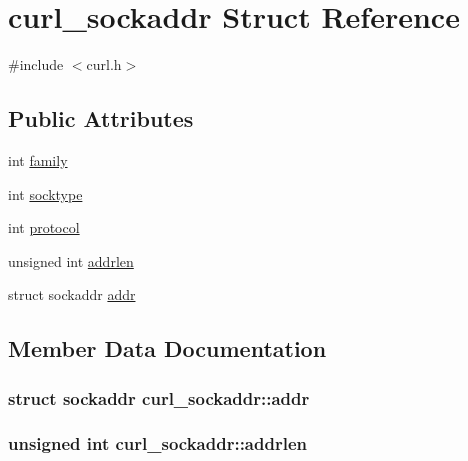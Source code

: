 \hypertarget{structcurl__sockaddr}{}\section{curl\+\_\+sockaddr Struct Reference}
\label{structcurl__sockaddr}


{\ttfamily \#include $<$curl.\+h$>$}

\subsection*{Public Attributes}
\begin{DoxyCompactItemize}
\item 
int \hyperlink{structcurl__sockaddr_ad5406982faaa070b7c928686ed31fdae}{family}
\item 
int \hyperlink{structcurl__sockaddr_a2c6c2c2083f3436c8b46c7d658be9aca}{socktype}
\item 
int \hyperlink{structcurl__sockaddr_ab59abd90c680d1f37217c3f65ea58a02}{protocol}
\item 
unsigned int \hyperlink{structcurl__sockaddr_a284d80484bad142443fe26ddbe427ff2}{addrlen}
\item 
struct sockaddr \hyperlink{structcurl__sockaddr_afb5fbd416cdfa9f83791e9a23e5266c2}{addr}
\end{DoxyCompactItemize}


\subsection{Member Data Documentation}
\subsubsection[{\texorpdfstring{addr}{addr}}]{\setlength{\rightskip}{0pt plus 5cm}struct sockaddr curl\+\_\+sockaddr\+::addr}\hypertarget{structcurl__sockaddr_afb5fbd416cdfa9f83791e9a23e5266c2}{}\label{structcurl__sockaddr_afb5fbd416cdfa9f83791e9a23e5266c2}
\subsubsection[{\texorpdfstring{addrlen}{addrlen}}]{\setlength{\rightskip}{0pt plus 5cm}unsigned int curl\+\_\+sockaddr\+::addrlen}\hypertarget{structcurl__sockaddr_a284d80484bad142443fe26ddbe427ff2}{}\label{structcurl__sockaddr_a284d80484bad142443fe26ddbe427ff2}
